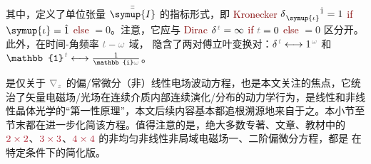 其中，定义了单位张量 $\bar{\bar{\symup{I}}}$ 的指标形式，即 \textcolor{Maroon}{Kronecker} $\delta^{\;\! \hphantom{\symup{\iota}} \hat{1}}_{\;\! \symup{\iota} \hphantom{z}} = 1$ \textcolor{Maroon}{if} $\symup{\iota} = \hat{1}$ \textcolor{Maroon}{else} $= 0$。注意，它应与 \textcolor{Maroon}{Dirac} $\delta^{\;\! \mathcolor{gray}{t}} = \infty$ \textcolor{Maroon}{if} $\mathcolor{gray}{t} = 0$ \textcolor{Maroon}{else} $= 0$ 区分开。此外，在时间-角频率 $\mathcolor{gray}{t} - \mathcolor{gray}{\omega}$ 域， 隐含了两对傅立叶变换对：$\delta^{\;\! \mathcolor{gray}{t}} \longleftrightarrow 1^{\;\! \mathcolor{gray}{\omega}}$ 和 $\mathbb{1}^{\;\! \mathcolor{gray}{t}} \longleftrightarrow \frac{1}{\mathbb{i} \mathcolor{gray}{\omega}}$。

 是仅关于 $\mathcolor{gray}{\nabla_z}$ 的偏/常微分（非）线性电场波动方程，也是本文关注的焦点，它统治了矢量电磁场/光场在连续介质内部连续演化/分布的动力学行为，是线性和非线性晶体光学的“第一性原理”，本文后续内容基本都追根溯源地来自于之。本小节至节末都在进一步化简该方程。值得注意的是，绝大多数专著、文章、教材中的 $\textcolor{Maroon}{2 \times 2}$、$\textcolor{Maroon}{3 \times 3}$、$\textcolor{Maroon}{4 \times 4}$ 的非均匀非线性非局域电磁场一、二阶偏微分方程\cite{zhangRigorousModelingLaser2015,zhangFullyVectorialSimulation2016,stallingaBerreman4x4Matrix1999,borzdovWavesLinearQuadratic1996,changWavePropagationBianisotropic2014,sturmElectromagneticWavesCrystals2024,sturmElectromagneticWavesCrystals2024,mcleodVectorFourierOptics2014,berryOpticalSingularitiesBianisotropic2005,raabMultipoleTheoryElectromagnetism2004}，都是  在特定条件下的简化版。%

